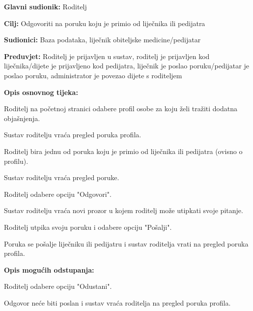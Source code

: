 					\noindent {}
					\begin{packed_item}
						
						\item \textbf{Glavni sudionik: }Roditelj
						\item  \textbf{Cilj:} Odgovoriti na poruku koju je primio od liječnika ili pedijatra
						\item  \textbf{Sudionici:} Baza podataka, liječnik obiteljske medicine/pedijatar
						\item  \textbf{Preduvjet:} Roditelj je prijavljen u sustav, roditelj je prijavljen kod liječnika/dijete je prijavljeno kod pedijatra, liječnik je poslao poruku/pedijatar je poslao poruku, administrator je povezao dijete s roditeljem
						\item  \textbf{Opis osnovnog tijeka:}
						
						\item[] \begin{packed_enum}
							
							\item Roditelj na početnoj stranici odabere profil osobe za koju želi tražiti dodatna objašnjenja.
							\item Sustav roditelju vraća pregled poruka profila.
							\item Roditelj bira jednu od poruka koju je primio od liječnika ili pedijatra (ovisno o profilu).
							\item Sustav roditelju vraća pregled poruke.
							\item Roditelj odabere opciju "Odgovori".
							\item Sustav roditelju vraća novi prozor u kojem roditelj može utipkati svoje pitanje.
							\item Roditelj utpika svoju poruku i odabere opciju "Pošalji".
							\item Poruka se pošalje liječniku ili pedijatru i sustav roditelja vrati na pregled poruka profila.
						\end{packed_enum}
						
						\item  \textbf{Opis mogućih odstupanja:}
						
						\item[] \begin{packed_item}
							
							\item[7.a] Roditelj odabere opciju "Odustani".
							\item[] \begin{packed_enum}
								
								\item Odgovor neće biti poslan i sustav vraća roditelja na pregled poruka profila.
							\end{packed_enum}
							
							
						\end{packed_item}
						
						
					\end{packed_item}
					
